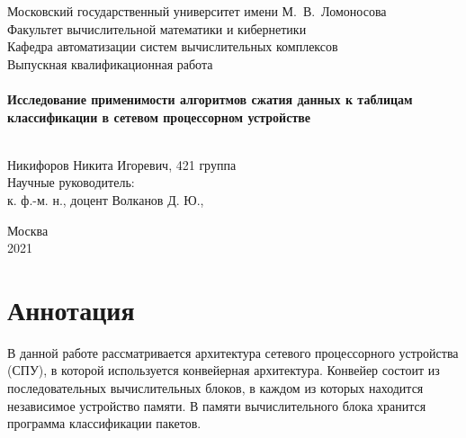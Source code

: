 \documentclass[a4paper, 12pt, titlepage, finall]{extreport}
\begin{document}
    \begin{titlepage}
        \begin{center}
            {\small \sc Московский государственный университет имени М.~В.~Ломоносова\\
            Факультет вычислительной математики и кибернетики\\
            Кафедра автоматизации систем вычислительных комплексов\\}
            \vfill
            {\large \sc Выпускная квалификационная работа}\\~\\

            {\large \bf Исследование применимости алгоритмов сжатия данных к таблицам классификации в сетевом процессорном устройстве}\\~\\

        \end{center}
        
        \begin{flushright}
            \vfill
            \vfill
            {Никифоров Никита Игоревич, 421 группа}\\
            {Научные руководитель:}\\
            {к. ф.-м. н., доцент Волканов Д. Ю.,}\\
        \end{flushright}

        \begin{center}
            \vfill
            {\small Москва\\2021}
        \end{center}
    \end{titlepage}

    \chapter*{Аннотация}
        В данной работе рассматривается архитектура сетевого процессорного устройства (СПУ), в которой используется конвейерная архитектура.
        Конвейер состоит из последовательных вычислительных блоков, в каждом из которых находится независимое устройство памяти.
        В памяти вычислительного блока хранится программа классификации пакетов.         

    \newpage
    \tableofcontents
    \newpage
\end{document}
